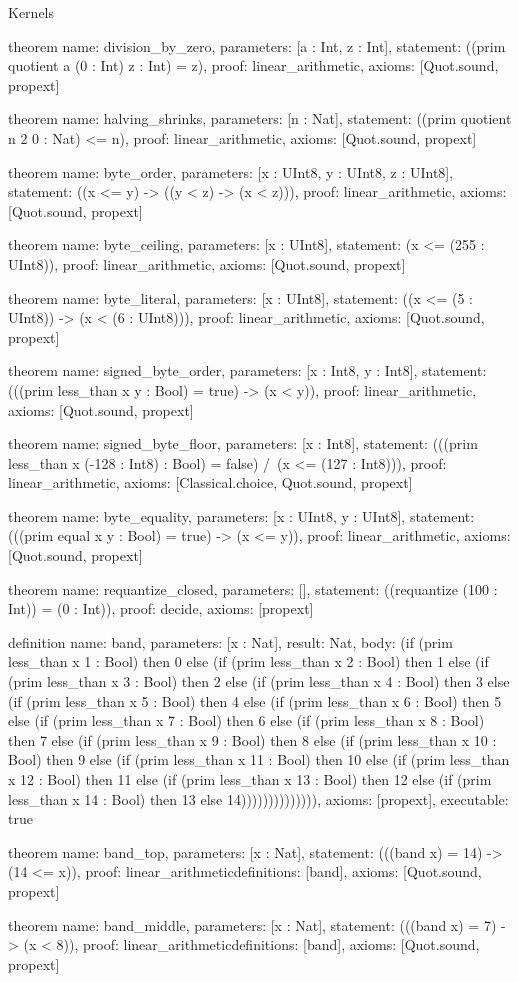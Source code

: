 \begin{lexlean}{Kernels}
\begin{semanticmodule}
theorem{
  name: division_by_zero,
  parameters: [a : Int, z : Int],
  statement: ((prim quotient a (0 : Int) z : Int) = z),
  proof: linear_arithmetic{},
  axioms: [Quot.sound, propext]
}

theorem{
  name: halving_shrinks,
  parameters: [n : Nat],
  statement: ((prim quotient n 2 0 : Nat) <= n),
  proof: linear_arithmetic{},
  axioms: [Quot.sound, propext]
}

theorem{
  name: byte_order,
  parameters: [x : UInt8, y : UInt8, z : UInt8],
  statement: ((x <= y) -> ((y < z) -> (x < z))),
  proof: linear_arithmetic{},
  axioms: [Quot.sound, propext]
}

theorem{
  name: byte_ceiling,
  parameters: [x : UInt8],
  statement: (x <= (255 : UInt8)),
  proof: linear_arithmetic{},
  axioms: [Quot.sound, propext]
}

theorem{
  name: byte_literal,
  parameters: [x : UInt8],
  statement: ((x <= (5 : UInt8)) -> (x < (6 : UInt8))),
  proof: linear_arithmetic{},
  axioms: [Quot.sound, propext]
}

theorem{
  name: signed_byte_order,
  parameters: [x : Int8, y : Int8],
  statement: (((prim less_than x y : Bool) = true) -> (x < y)),
  proof: linear_arithmetic{},
  axioms: [Quot.sound, propext]
}

theorem{
  name: signed_byte_floor,
  parameters: [x : Int8],
  statement: (((prim less_than x (-128 : Int8) : Bool) = false) /\ (x <= (127 : Int8))),
  proof: linear_arithmetic{},
  axioms: [Classical.choice, Quot.sound, propext]
}

theorem{
  name: byte_equality,
  parameters: [x : UInt8, y : UInt8],
  statement: (((prim equal x y : Bool) = true) -> (x <= y)),
  proof: linear_arithmetic{},
  axioms: [Quot.sound, propext]
}

theorem{
  name: requantize_closed,
  parameters: [],
  statement: ((requantize (100 : Int)) = (0 : Int)),
  proof: decide{},
  axioms: [propext]
}

definition{
  name: band,
  parameters: [x : Nat],
  result: Nat,
  body: (if (prim less_than x 1 : Bool) then 0 else (if (prim less_than x 2 : Bool) then 1 else (if (prim less_than x 3 : Bool) then 2 else (if (prim less_than x 4 : Bool) then 3 else (if (prim less_than x 5 : Bool) then 4 else (if (prim less_than x 6 : Bool) then 5 else (if (prim less_than x 7 : Bool) then 6 else (if (prim less_than x 8 : Bool) then 7 else (if (prim less_than x 9 : Bool) then 8 else (if (prim less_than x 10 : Bool) then 9 else (if (prim less_than x 11 : Bool) then 10 else (if (prim less_than x 12 : Bool) then 11 else (if (prim less_than x 13 : Bool) then 12 else (if (prim less_than x 14 : Bool) then 13 else 14)))))))))))))),
  axioms: [propext],
  executable: true
}

theorem{
  name: band_top,
  parameters: [x : Nat],
  statement: (((band x) = 14) -> (14 <= x)),
  proof: linear_arithmetic{definitions: [band]},
  axioms: [Quot.sound, propext]
}

theorem{
  name: band_middle,
  parameters: [x : Nat],
  statement: (((band x) = 7) -> (x < 8)),
  proof: linear_arithmetic{definitions: [band]},
  axioms: [Quot.sound, propext]
}
\end{semanticmodule}
\end{lexlean}
